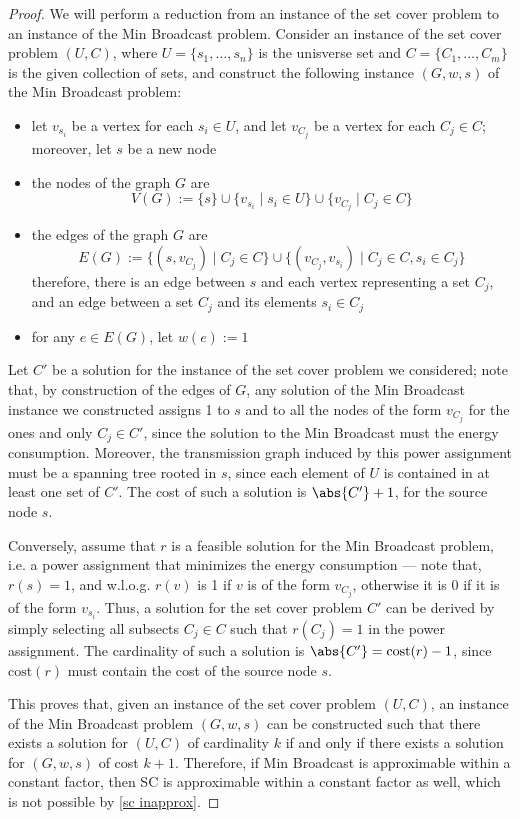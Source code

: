 \documentclass[a4paper, 12pt]{report}
\begin{document}
    \begin{proof}
        We will perform a reduction from an instance of the set cover problem to an instance of the Min Broadcast problem. Consider an instance of the set cover problem $(U, C)$, where $U = \{s_1, \ldots, s_n\}$ is the unisverse set and $C = \{C_1, \ldots, C_m\}$ is the given collection of sets, and construct the following instance $(G, w, s)$ of the Min Broadcast problem:

        \begin{itemize}
            \item let $v_{s_i}$ be a vertex for each $s_i \in U$, and let $v_{C_j}$ be a vertex for each $C_j \in C$; moreover, let $s$ be a new node
            \item the nodes of the graph $G$ are $$V(G) := \{s\} \cup \{v_{s_i} \mid s_i \in U\} \cup \{v_{C_j} \mid C_j \in C\}$$
            \item the edges of the  graph $G$ are $$E(G) := \{(s, v_{C_j}) \mid C_j \in C\} \cup \{(v_{C_j}, v_{s_i}) \mid C_j \in C, s_i \in C_j\}$$ therefore, there is an edge between $s$ and each vertex representing a set $C_j$, and an edge between a set $C_j$ and its elements $s_i \in C_j$
            \item for any $e \in E(G)$, let $w(e) := 1$
        \end{itemize}
        
        Let $C'$ be a solution for the instance of the set cover problem we considered; note that, by construction of the edges of $G$, any solution of the Min Broadcast instance we constructed assigns 1 to $s$ and to all the nodes of the form $v_{C_j}$ for the ones and only $C_j \in C'$, since the solution to the Min Broadcast must  the energy consumption. Moreover, the transmission graph induced by this power assignment must be a spanning tree rooted in $s$, since each element of $U$ is contained in at least one set of $C'$. The cost of such a solution is $\abs{C'} + 1$, for the source node $s$.

        Conversely, assume that $r$ is a feasible solution for the Min Broadcast problem, i.e. a power assignment that minimizes the energy consumption --- note that, $r(s) = 1$, and w.l.o.g. $r(v)$ is 1 if $v$ is of the form $v_{C_j}$, otherwise it is 0 if it is of the form $v_{s_i}$. Thus, a solution for the set cover problem $C'$ can be derived by simply selecting all subsects $C_j \in C$ such that $r(C_j) = 1$ in the power assignment. The cardinality of such a solution is $\abs{C'} = \mathrm{cost}(r) - 1$, since $\mathrm{cost}(r)$ must contain the cost of the source node $s$.

        This proves that, given an instance of the set cover problem $(U, C)$, an instance of the Min Broadcast problem $(G, w, s)$ can be constructed such that there exists a solution for $(U, C)$ of cardinality $k$ if and only if there exists a solution for $(G, w, s)$ of cost $k + 1$. Therefore, if Min Broadcast is approximable within a constant factor, then SC is approximable within a constant factor as well, which is not possible by \cref{sc inapprox}.
    \end{proof}
\end{document}

